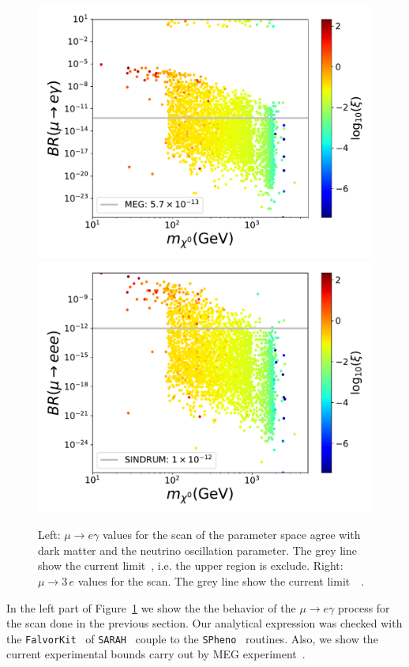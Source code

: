 \documentclass[12pt,letterpaper]{article}
\begin{document}
\begin{figure}
\begin{center}
\includegraphics[scale=0.43]{ueg_with_neutrino_physics}
\includegraphics[scale=0.43]{u3e_with_neutrino_physics}
\caption{Left: $\mu\rightarrow e\gamma$ values for the scan of the parameter space agree with dark matter and the neutrino oscillation parameter. The grey line show the current limit~\cite{Adam:2013mnn}, i.e. the upper region is exclude.
Right: $\mu\rightarrow 3\,e$ values for the scan. The grey line show the current limit~~\cite{Bertl:1985mw}.}
\label{fig:ueg-e3e}
\end{center}
\end{figure}
%
In the left part of Figure~\ref{fig:ueg-e3e} we show the the behavior of the $\mu\rightarrow e\gamma$ process for the scan done in the previous section. Our analytical expression was checked with the \texttt{FalvorKit}~\cite{Porod:2014xia} of \texttt{SARAH}~\cite{Staub:2008uz,Staub:2013tta} couple to the \texttt{SPheno}~\cite{Porod:2003um,Porod:2011nf} routines. Also, we show the current experimental bounds carry out by MEG experiment~\cite{Adam:2013mnn}. 
\end{document}
